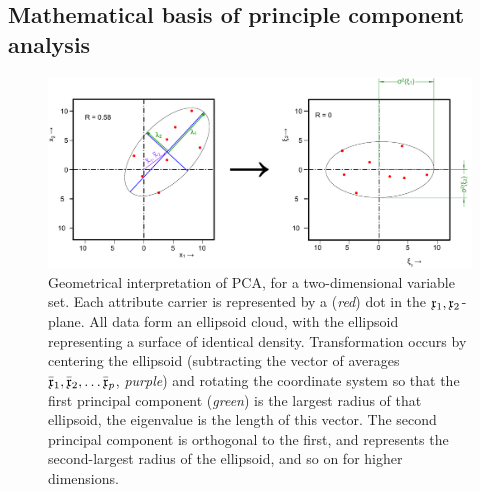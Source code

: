\begin{refsection}
\section{Mathematical basis of principle component analysis}

\begin{figure}
   \caption{Geometrical interpretation of PCA, for a two-dimensional variable set. Each attribute carrier is
   represented by a (\emph{red}) dot in the \(\mathfrak{x}_1, \mathfrak{x}_2 \)-plane. All data form an ellipsoid cloud,
   with the ellipsoid representing a surface of identical density. Transformation occurs by centering the
   ellipsoid (subtracting the vector of averages \(\bar{\mathfrak{x}}_1, \bar{\mathfrak{x}}_2, \ldots
   \bar{\mathfrak{x}}_p \), \emph{purple}) and rotating the coordinate system so that the first principal component
   (\emph{green}) is the largest radius of that ellipsoid, the eigenvalue is the length of this vector. The second
   principal component is orthogonal to the first, and represents the second-largest radius of the ellipsoid, and
   so on for higher dimensions. }
   \label{fig:PCA-geo}
   \centering
      \includegraphics[width=\textwidth]{Graphics/PCA}
\end{figure}


\end{refsection}
